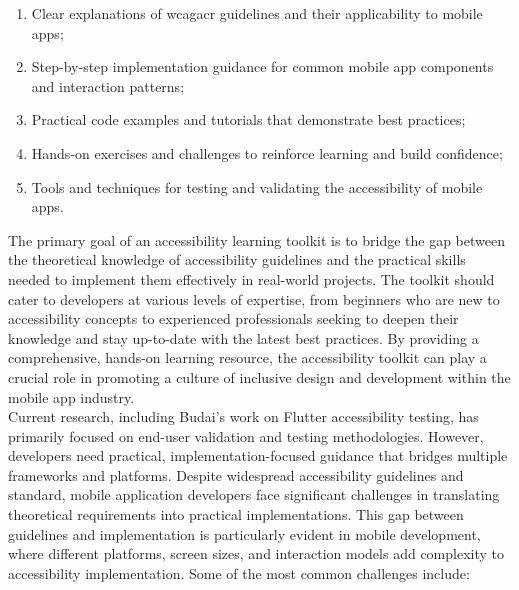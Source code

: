 \begin{enumerate}
    \item Clear explanations of \acrshort{wcagacr} guidelines and their applicability to mobile apps;
    
    \item Step-by-step implementation guidance for common mobile app components and interaction patterns;
    
    \item Practical code examples and tutorials that demonstrate best practices;
    
    \item Hands-on exercises and challenges to reinforce learning and build confidence;
    
    \item Tools and techniques for testing and validating the accessibility of mobile apps.
\end{enumerate}

The primary goal of an accessibility learning toolkit is to bridge the gap between the theoretical knowledge of accessibility guidelines and the practical skills needed to implement them effectively in real-world projects. 
The toolkit should cater to developers at various levels of expertise, from beginners who are new to accessibility concepts to experienced professionals seeking to deepen their knowledge and stay up-to-date with the latest best practices. By providing a comprehensive, hands-on learning resource, the accessibility toolkit can play a crucial role in promoting a culture of inclusive design and development within the mobile app industry. \\

Current research, including Budai's work on Flutter accessibility testing, has primarily focused on end-user validation and testing methodologies. However, developers need practical, implementation-focused guidance that bridges multiple frameworks and platforms.
Despite widespread accessibility guidelines and standard, mobile application developers face significant challenges in translating theoretical requirements into practical implementations. This gap between guidelines and implementation is particularly evident in mobile development, where different platforms, screen sizes, and interaction models add complexity to accessibility implementation. Some of the most common challenges include:

